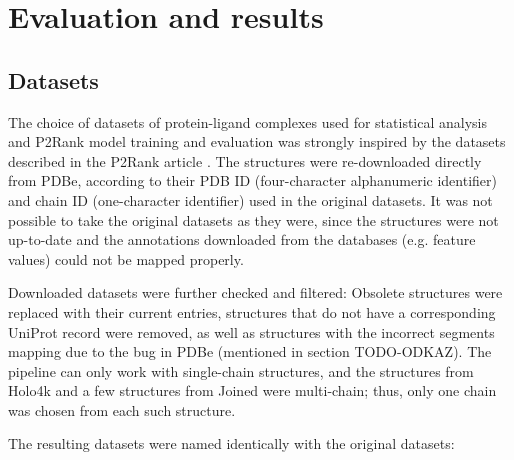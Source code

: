 \chapter{Evaluation and results} \label{ch:4}


\section{Datasets}


The choice of datasets of protein-ligand complexes used for statistical analysis and P2Rank model training and evaluation was strongly inspired by the datasets described in the P2Rank article \cite{p2rank1}. The structures were re-downloaded directly from PDBe, according to their PDB ID (four-character alphanumeric identifier) and chain ID (one-character identifier) used in the original datasets. It was not possible to take the original datasets as they were, since the structures were not up-to-date and the annotations downloaded from the databases (e.g. feature values) could not be mapped properly.

Downloaded datasets were further checked and filtered: Obsolete structures were replaced with their current entries, structures that do not have a corresponding UniProt record were removed, as well as  structures with the incorrect segments mapping due to the bug in PDBe (mentioned in section TODO-ODKAZ). The pipeline can only work with single-chain structures, and the structures from Holo4k and a few structures from Joined were multi-chain; thus, only one chain was chosen from each such structure.


The resulting datasets were named identically with the original datasets:

